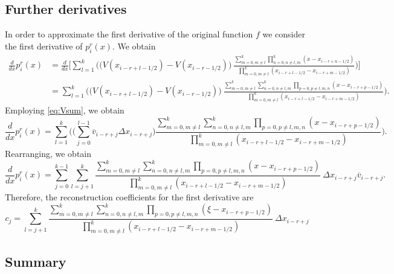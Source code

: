 \documentclass{article}
\newcommand{\dd}[2]{\frac{d #1}{d #2}}
\numberwithin{equation}{section}
\begin{document}
\subsection{Further derivatives}

In order to approximate the first derivative of the original function
$f$ we consider the first derivative of $p^r_i(x)$.  We obtain
\begin{align*}
  \dd{}{x} p^r_i(x) &= \dd{}{x} \Biggl[ \sum_{l=1}^{k} \Biggl(
  \bigl( V(x_{i-r+l-1/2}) - V(x_{i-r-1/2}) \bigr) \
    \frac{\sum_{m=0, m \neq l}^{k} \prod_{n=0, n \neq l,m}^{k}
      (x - x_{i-r+n-1/2})}{\prod_{m=0, m \neq l}^{k}
      (x_{i-r+l-1/2} - x_{i-r+m-1/2})} \Biggr) \Biggr] \\
    &= \sum_{l=1}^{k} \Biggl(
    \bigl( V(x_{i-r+l-1/2}) - V(x_{i-r-1/2}) \bigr) \
    \frac{\sum_{m=0, m \neq l}^{k} \sum_{n=0, n \neq l,m}^{k} \prod_{p=0, p \neq l, m, n}
      (x - x_{i-r+p-1/2})}{\prod_{m=0, m \neq l}^{k}
      (x_{i-r+l-1/2} - x_{i-r+m-1/2})} \Biggr).
\end{align*}
Employing \eqref{eq:Vsum}, we obtain
\begin{equation*}
  \dd{}{x} p^r_i(x) = \sum_{l=1}^{k} \Biggl(
  \biggl( \sum_{j=0}^{l-1} \overline{v}_{i-r+j} \Delta x_{i-r+j} \biggr)
  \frac{\sum_{m=0, m \neq l}^{k} \sum_{n=0, n \neq l,m}^{k} \prod_{p=0, p \neq l, m, n}
    (x - x_{i-r+p-1/2})}{\prod_{m=0, m \neq l}^{k}
    (x_{i-r+l-1/2} - x_{i-r+m-1/2})} \Biggr).
\end{equation*}
Rearranging, we obtain
\begin{equation*}
  \dd{}{x} p^r_i(x) = \sum_{j=0}^{k-1} \sum_{l=j+1}^k
  \frac{\sum_{m=0, m \neq l}^{k} \sum_{n=0, n \neq l,m}^{k} \prod_{p=0, p \neq l, m, n}
    (x - x_{i-r+p-1/2})}{\prod_{m=0, m \neq l}^{k}
    (x_{i-r+l-1/2} - x_{i-r+m-1/2})}
  \ \Delta x_{i-r+j} \overline{v}_{i-r+j}.
\end{equation*}
Therefore, the reconstruction coefficients for the first derivative
are
\begin{equation*}
  c_j = \sum_{l=j+1}^k
  \frac{\sum_{m=0, m \neq l}^{k} \sum_{n=0, n \neq l,m}^{k} \prod_{p=0, p \neq l, m, n}
    (\xi - x_{i-r+p-1/2})}{\prod_{m=0, m \neq l}^{k}
    (x_{i-r+l-1/2} - x_{i-r+m-1/2})}
  \ \Delta x_{i-r+j}
\end{equation*}

\subsection{Summary}
\end{document}
